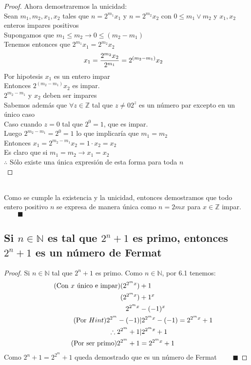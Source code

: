 \begin{proof}
        Ahora demostraremos la unicidad: \\
        Sean $m_1,m_2,x_1,x_2$ tales que $n = 2^{m_1}x_1$ y $n= 2^{m_2}x_2$ con $0 \leq m_1 \vee m_2$ y $x_1,x_2$ enteros impares positivos \\
        Supongamos que $m_1 \leq m_2 \rightarrow 0 \leq (m_2-m_1)$ \\
        Tenemos entonces que $2^{m_1}x_1 = 2^{m_2}x_2$ 
        \begin{align}
            \notag x_1 &= \frac{2^{m_2}x_2}{2^{m_1}} = 2^{(m_2-m_1)}x_2
        \end{align}
        Por hipotesis $x_1$ es un entero impar \\
        Entonces $ 2^{(m_2-m_1)}x_2$ es impar. \\
        \therefore $2^{m_2-m_1}$ y $x_2$ deben ser impares \\
        Sabemos además que $\forall z \in \mathbb{Z} $ tal que $z \neq 0 2^z$ es un número par excepto en un único caso\\
        Caso cuando $z=0$ tal que $2^0 = 1$, que es impar.\\
        Luego $2^{m_2-m_1} = 2^0 = 1$ lo que implicaría que $m_1=m_2$ \\
        Entonces $x_1 = 2^{m_2-m_1}x_2 = 1\cdot x_2 = x_2$ \\
        Es claro que si $m_1=m_2 \rightarrow x_1=x_2$ \\
        $\therefore$ Sólo existe una única expresión de esta forma para toda $n$ \\
    \end{proof}
    \\ Como se cumple la existencia y la unicidad, entonces demostramos que todo entero positivo $n$ se expresa de manera única como $n = 2mx$ para $x \in \mathbb{Z}$ impar. $\qquad \blacksquare$
    \subsection{Si $n \in \mathbb{N}$ es tal que $2^n + 1$ es primo, entonces $2^n + 1$ es un número de Fermat} 
    \begin{proof}
        Si $n \in \mathbb{N}$ tal que $2^n+1$ es primo. Como $ n \in \mathbb{N}$, por 6.1 tenemos:
        \begin{align}
            \tag{Con $x$ único e impar} (2^{2^mx})&+1 \\
            \notag (2^{2^mx})&+1^x \\  
            \notag 2^{2^mx}&-(-1)^x \\
            \tag{Por $Hint$} 2^{2^m}-(-1) &| 2^{2^mx} -(-1) = 2^{2^mx}+1 \\
            \notag \therefore 2^{2^m}+1 &| 2^{2^mx}+1 \\
            \tag{Por ser primo} 2^{2^m} + 1 &= 2^{2^mx}+1
        \end{align}
        Como $2^n+1= 2^{2^m} + 1$ queda demostrado que es un número de Fermat $\qquad \blacksquare$
    \end{proof}